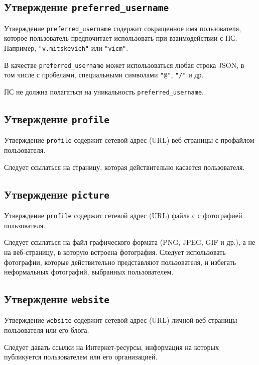 \subsection{Утверждение \lstinline{preferred_username}}
\label{CLAIMS.PreferredUsername} 

Утверждение \lstinline{preferred_username} содержит сокращенное имя 
пользователя, которое пользователь предпочитает использовать при взаимодействии 
с ПС. Например, \lstinline{"v.mitskevich"} или \lstinline{"vicm"}.

В качестве \lstinline{preferred_username} может использоваться любая 
строка JSON, в том числе с пробелами, специальными символами 
\lstinline{"@"}, \lstinline{"/"} и др.

ПС не должна полагаться на уникальность \lstinline{preferred_username}.

\subsection{Утверждение \lstinline{profile}}\label{CLAIMS.Profile}

Утверждение \lstinline{profile} содержит сетевой адрес (URL) веб-страницы
с профайлом пользователя. 

Следует ссылаться на страницу, которая действительно касается пользователя.

\subsection{Утверждение \lstinline{picture}}\label{CLAIMS.Picture}

Утверждение \lstinline{profile} содержит сетевой адрес (URL) файла с 
с фотографией пользователя. 

Следует ссылаться на файл графического формата (PNG, JPEG, GIF и др.),
а не на веб-страницу, в которую встроена фотография.
%
Следует использовать фотографии, которые действительно представляют 
пользователя, и избегать неформальных фотографий, выбранных пользователем.

\subsection{Утверждение \lstinline{website}}\label{CLAIMS.Website}

Утверждение \lstinline{website} содержит сетевой адрес (URL) личной 
веб-страницы пользователя или его блога.

Следует давать ссылки на Интернет-ресурсы, информация на которых публикуется 
пользователем или его организацией.

